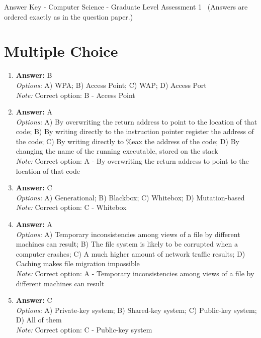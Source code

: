\documentclass[12pt]{article}
\begin{document}
\begin{center}
Answer Key - Computer Science - Graduate Level Assessment 1 \
\small (Answers are ordered exactly as in the question paper.)
\end{center}

\section*{Multiple Choice}
\begin{enumerate}[label=\arabic*.]
\item \textbf{Answer:} B
\\ \textit{Options:} A) WPA; B) Access Point; C) WAP; D) Access Port
\\ \textit{Note:} Correct option: B - Access Point
\item \textbf{Answer:} A
\\ \textit{Options:} A) By overwriting the return address to point to the location of that code; B) By writing directly to the instruction pointer register the address of the code; C) By writing directly to \%eax the address of the code; D) By changing the name of the running executable, stored on the stack
\\ \textit{Note:} Correct option: A - By overwriting the return address to point to the location of that code
\item \textbf{Answer:} C
\\ \textit{Options:} A) Generational; B) Blackbox; C) Whitebox; D) Mutation-based
\\ \textit{Note:} Correct option: C - Whitebox
\item \textbf{Answer:} A
\\ \textit{Options:} A) Temporary inconsistencies among views of a file by different machines can result; B) The file system is likely to be corrupted when a computer crashes; C) A much higher amount of network traffic results; D) Caching makes file migration impossible
\\ \textit{Note:} Correct option: A - Temporary inconsistencies among views of a file by different machines can result
\item \textbf{Answer:} C
\\ \textit{Options:} A) Private-key system; B) Shared-key system; C) Public-key system; D) All of them
\\ \textit{Note:} Correct option: C - Public-key system
\end{enumerate}
\end{document}
